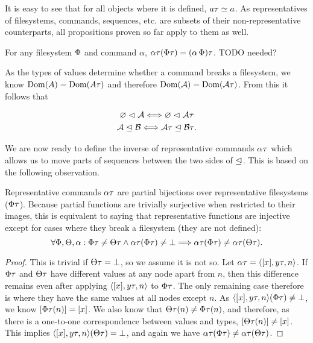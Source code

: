 It is easy to see that for all objects where it is defined, $a\tau\simeq a$.
As representatives of filesystems, commands, sequences, etc.
are subsets of their non-representative counterparts, all
propositions proven so far apply to them as well.

\begin{mycor}
For any filesystem $\Phi$ and command $\alpha$, 
$\alpha\tau(\Phi\tau) = (\alpha\,\Phi)\tau$.
TODO needed?
\end{mycor}


As the types of values determine whether a command breaks a filesystem,
we know $\textrm{Dom}({A})=\textrm{Dom}({A\tau})$ and therefore $\textrm{Dom}({\mathcal{A}})=\textrm{Dom}({\mathcal{A}\tau})$.
From this it follows that

\begin{mycor}\label{repr_works_is_same}
\begin{gather*}
{\varnothing}\vartriangleleft{\mathcal{A}} \Longleftrightarrow {\varnothing}\vartriangleleft{\mathcal{A}\tau} \\
{\mathcal{A}}\trianglelefteq{\mathcal{B}} \Longleftrightarrow {\mathcal{A}\tau}\trianglelefteq{\mathcal{B}\tau}.
\end{gather*}
\end{mycor}


We are now ready to define the inverse of representative commands $\alpha\tau$
which allows us to move parts of sequences between the
two sides of $\trianglelefteq$.
This is based on the following observation.

\begin{mylem}\label{repr_comm_inject}
Representative commands $\alpha\tau$ are partial bijections over representative filesystems ($\Phi\tau$).
Because partial functions are trivially surjective when restricted to their images, this is
equivalent to saying that representative functions are injective except for cases
where they break a filesystem (they are not defined):
\[ \forall\Phi,\Theta,\alpha: \Phi\tau\neq\Theta\tau \wedge \alpha\tau(\Phi\tau)\neq\bot \Longrightarrow \alpha\tau(\Phi\tau) \neq \alpha\tau(\Theta\tau). \]
\end{mylem}
\begin{proof}
This is trivial if $\Theta\tau=\bot$, so we assume it is not so.
Let $\alpha\tau = \langle{[x],{y}\tau,n}\rangle$.
If $\Phi\tau$ and $\Theta\tau$ have different values at any node apart from $n$, then this difference remains
even after applying $\langle{[x],{y}\tau,n}\rangle$ to $\Phi\tau$. The only remaining case therefore is where they have the same values
at all nodes except $n$.
As $\langle{[x],{y}\tau,n}\rangle(\Phi\tau)\neq\bot$, we know $[\Phi\tau(n)]=[x]$.
We also know that $\Theta\tau(n)\neq\Phi\tau(n)$, and therefore, as there is a one-to-one correspondence between values and types,
$[\Theta\tau(n)]\neq[x]$.
This implies $\langle{[x],{y}\tau,n}\rangle(\Theta\tau)=\bot$,
and again we have $\alpha\tau(\Phi\tau) \neq \alpha\tau(\Theta\tau)$.
\end{proof}

